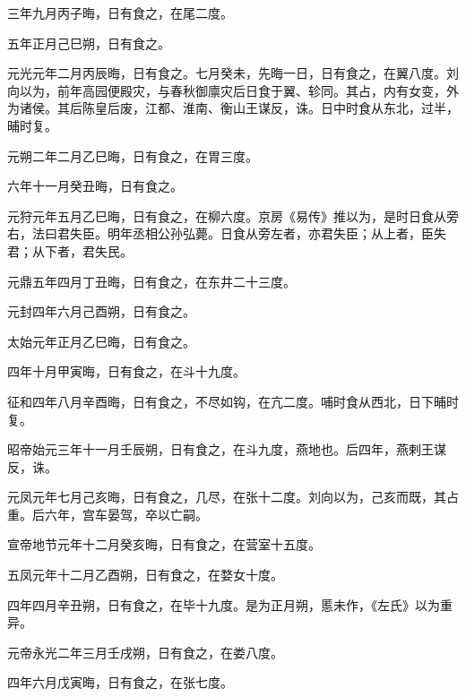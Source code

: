 \documentclass[12pt,UTF8]{ctexbook}
\begin{document}
三年九月丙子晦，日有食之，在尾二度。



五年正月己巳朔，日有食之。



元光元年二月丙辰晦，日有食之。七月癸未，先晦一日，日有食之，在翼八度。刘向以为，前年高园便殿灾，与春秋御廪灾后日食于翼、轸同。其占，内有女变，外为诸侯。其后陈皇后废，江都、淮南、衡山王谋反，诛。日中时食从东北，过半，晡时复。



元朔二年二月乙巳晦，日有食之，在胃三度。



六年十一月癸丑晦，日有食之。



元狩元年五月乙巳晦，日有食之，在柳六度。京房《易传》推以为，是时日食从旁右，法曰君失臣。明年丞相公孙弘薨。日食从旁左者，亦君失臣；从上者，臣失君；从下者，君失民。



元鼎五年四月丁丑晦，日有食之，在东井二十三度。



元封四年六月己酉朔，日有食之。



太始元年正月乙巳晦，日有食之。



四年十月甲寅晦，日有食之，在斗十九度。



征和四年八月辛酉晦，日有食之，不尽如钩，在亢二度。哺时食从西北，日下晡时复。



昭帝始元三年十一月壬辰朔，日有食之，在斗九度，燕地也。后四年，燕剌王谋反，诛。



元凤元年七月己亥晦，日有食之，几尽，在张十二度。刘向以为，己亥而既，其占重。后六年，宫车晏驾，卒以亡嗣。



宣帝地节元年十二月癸亥晦，日有食之，在营室十五度。



五凤元年十二月乙酉朔，日有食之，在婺女十度。



四年四月辛丑朔，日有食之，在毕十九度。是为正月朔，慝未作，《左氏》以为重异。



元帝永光二年三月壬戌朔，日有食之，在娄八度。



四年六月戊寅晦，日有食之，在张七度。
\end{document}
